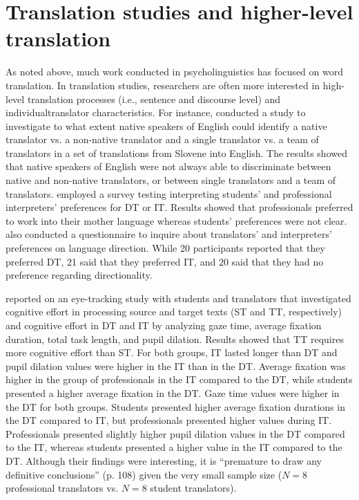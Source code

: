 \documentclass[output=paper]{langscibook}
\begin{document}
\section{Translation studies and higher-level translation}
As noted above, much work conducted in psycholinguistics has focused on word translation. In translation studies, researchers are often more interested in high-level translation processes (i.e., sentence and discourse level) and individual\linebreak translator characteristics. For instance, \citet{pokorn2004challenging} conducted a study to investigate to what extent native speakers of English could identify a native translator vs. a non-native translator and a single translator vs. a team of translators in a set of translations from Slovene into English. The results showed that native speakers of English were not always able to discriminate between native and non-native translators, or between single translators and a team of translators. \citet{bartlomiejczyk2004simultaneous} employed a survey testing interpreting students’ and professional interpreters’ preferences for DT or IT. Results showed that professionals preferred to work into their mother language whereas students’ preferences were not clear. \citet{pavlovic2007directionality} also conducted a questionnaire to inquire about translators’ and interpreters’ preferences on language direction. While 20 participants reported that they preferred DT, 21 said that they preferred IT, and 20 said that they had no preference regarding directionality.
 
\citet{pavlovic2009eye} reported on an eye-tracking study with students and translators that investigated cognitive effort in processing source and target texts (ST and TT, respectively) and cognitive effort in DT and IT by analyzing gaze time, average fixation duration, total task length, and pupil dilation. Results showed that TT requires more cognitive effort than ST. For both groups, IT lasted longer than DT and pupil dilation values were higher in the IT than in the DT. Average fixation was higher in the group of professionals in the IT compared to the DT, while students presented a higher average fixation in the DT. Gaze time values were higher in the DT for both groups. Students presented higher average fixation durations in the DT compared to IT, but professionals presented higher values during IT. Professionals presented slightly higher pupil dilation values in the DT compared to the IT, whereas students presented a higher value in the IT compared to the DT. Although their findings were interesting, it is “premature to draw any definitive conclusions” (p. 108) given the very small sample size ($N=8$ professional translators vs. $N=8$ student translators).
\end{document}
